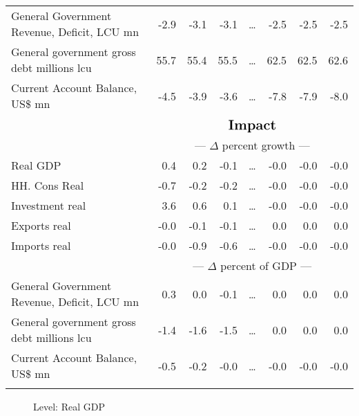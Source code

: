 \documentclass{article}
\begin{document}
\begin{table}[ht]
\begin{tabular}{lrrrrrrr}
General Government Revenue, Deficit, LCU mn & -2.9 & -3.1 & -3.1 & \dots & -2.5 & -2.5 & -2.5 \\
General government gross debt millions lcu & 55.7 & 55.4 & 55.5 & \dots & 62.5 & 62.5 & 62.6 \\
Current Account Balance, US\$ mn & -4.5 & -3.9 & -3.6 & \dots & -7.8 & -7.9 & -8.0 \\
&\multicolumn{7}{c}{{ }}                                                            \\
&\multicolumn{7}{c}{{$\Large \textbf{Impact}$}}                                                             \\
&\multicolumn{7}{c}{{--- $\Delta$  percent growth ---}}                                                            \\
Real GDP & 0.4 & 0.2 & -0.1 & \dots & -0.0 & -0.0 & -0.0 \\
HH. Cons Real & -0.7 & -0.2 & -0.2 & \dots & -0.0 & -0.0 & -0.0 \\
Investment real & 3.6 & 0.6 & 0.1 & \dots & -0.0 & -0.0 & -0.0 \\
Exports real & -0.0 & -0.1 & -0.1 & \dots & 0.0 & 0.0 & 0.0 \\
Imports real & -0.0 & -0.9 & -0.6 & \dots & -0.0 & -0.0 & -0.0 \\
&\multicolumn{7}{c}{{--- $\Delta$  percent of GDP ---}}                                                            \\
General Government Revenue, Deficit, LCU mn & 0.3 & 0.0 & -0.1 & \dots & 0.0 & 0.0 & 0.0 \\
General government gross debt millions lcu & -1.4 & -1.6 & -1.5 & \dots & 0.0 & 0.0 & 0.0 \\
Current Account Balance, US\$ mn & -0.5 & -0.2 & -0.0 & \dots & -0.0 & -0.0 & -0.0 \\
&\multicolumn{7}{c}{{ }}                                                             \\
\bottomrule
\end{tabular}
\end{table}
 
\begin{figure}[htbp]
\centering
\resizebox{\textwidth}{!}{}
\caption{Level: Real GDP}
\end{figure}
\end{document}
